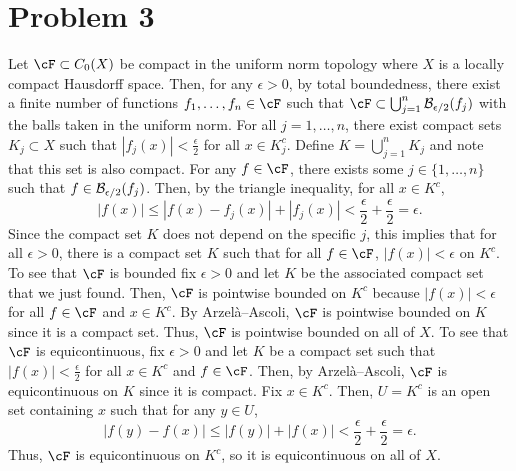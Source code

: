 \documentclass{article}
\begin{document}
\section{Problem 3}
Let $\cF\subset C_0(X)$ be compact in the uniform norm topology where $X$ is a locally compact Hausdorff space. Then, for any $\epsilon>0$, by total boundedness, there exist a finite number of functions $f_1,\ldots,f_n\in\cF$ such that $\cF\subset\bigcup_{j=1}^n\cB_{\epsilon/2}(f_j)$ with the balls taken in the uniform norm. For all $j=1,\ldots,n$, there exist compact sets $K_j\subset X$ such that $|f_j(x)|<\frac{\epsilon}{2}$ for all $x\in K^c_j$. Define $K=\bigcup_{j=1}^n K_j$ and note that this set is also compact. For any $f\in\cF$, there exists some $j\in\{1,\ldots,n\}$ such that $f\in{\cal B}_{\epsilon/2}(f_j)$. Then, by the triangle inequality, for all $x\in K^c$, 
\[
|f(x)|\leq|f(x)-f_j(x)|+|f_j(x)|<\frac{\epsilon}{2}+\frac{\epsilon}{2}=\epsilon. 
\]
Since the compact set $K$ does not depend on the specific $j$, this implies that for all $\epsilon>0$, there is a compact set $K$ such that for all $f\in\cF$, $|f(x)|<\epsilon$ on $K^c$. To see that $\cF$ is bounded fix $\epsilon>0$ and let $K$ be the associated compact set that we just found. Then, $\cF$ is pointwise bounded on $K^c$ because $|f(x)|<\epsilon$ for all $f\in\cF$ and $x\in K^c$. By Arzel\`a--Ascoli, $\cF$ is pointwise bounded on $K$ since it is a compact set. Thus, $\cF$ is pointwise bounded on all of $X$. To see that $\cF$ is equicontinuous, fix $\epsilon>0$ and let $K$ be a compact set such that $|f(x)|<\frac{\epsilon}{2}$ for all $x\in K^c$ and $f\in\cF$. Then, by Arzel\`a--Ascoli, $\cF$ is equicontinuous on $K$ since it is compact. Fix $x\in K^c$. Then, $U=K^c$ is an open set containing $x$ such that for any $y\in U$,
\[
|f(y)-f(x)|\leq|f(y)|+|f(x)|<\frac{\epsilon}{2}+\frac{\epsilon}{2}=\epsilon.
\]
Thus, $\cF$ is equicontinuous on $K^c$, so it is equicontinuous on all of $X$. 
\end{document}
